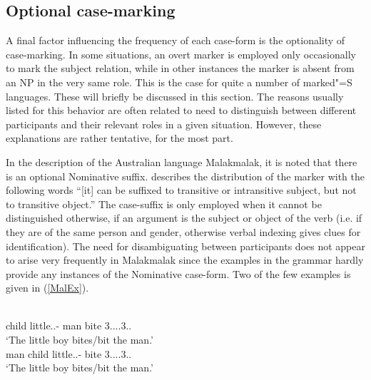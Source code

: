  
\subsection{Optional case-marking}\label{omitcase}

A final factor influencing the frequency of each case-form is the optionality of case-marking.
In some situations, an overt marker is employed only occasionally to mark the subject relation, while in other instances the marker is absent from an NP in the very same role. 
This is the case for quite a number of marked"=S languages. 
These will briefly be discussed in this section. 
The reasons usually listed for this behavior are often related to need to distinguish between different participants and their relevant roles in a given situation. 
However, these explanations are rather tentative, for the most part.  

In the description of the Australian language Malakmalak, it is noted that there is an optional Nominative suffix.
\citet[112]{Birk:1976} describes the distribution of the marker with the following words ``[it] can be suffixed to transitive or intransitive subject, but not to transitive object.'' 
The case-suffix is only employed when it cannot be distinguished otherwise, if an argument is the subject or object of the verb (i.e. if they are of the same person and gender, otherwise verbal indexing gives clues for identification). 
The need for disambiguating between participants does not appear to arise very frequently in Malakmalak since the examples in the grammar hardly provide any instances of the Nominative case-form. 
Two of the few examples is given in (\ref{MalEx}).


\begin{exe}\ex\label{MalEx}
\begin{xlist}
\ex\gll{}    \\
child little.\sg{}.\mas{}-\nom{} man bite 3\sg{}.\mas{}.\sbj{}.\punc{}.3\sg{}.\mas{}.\obj{}\\
\glt `The little boy bites/bit the man.'
\ex\gll{}    \\
man child little.\sg{}.\mas{}-\nom{} bite 3\sg{}.\mas{}.\sbj{}.\punc{}.3\sg{}.\mas{}.\obj{}\\
\glt `The little boy bites/bit the man.'
\end{xlist} 
\end{exe}

